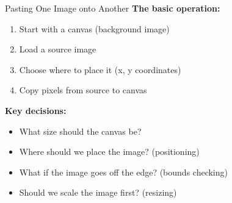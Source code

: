 \documentclass{csbeamer}
\begin{document}
\begin{frame}{Pasting One Image onto Another}
    \textbf{The basic operation:}

    \vspace{1em}

    \begin{enumerate}
        \item<1-> Start with a \textcolor{stfxblue}{canvas} (background image)
        \item<2-> Load a source image
        \item<3-> Choose where to place it (x, y coordinates)
        \item<4-> Copy pixels from source to canvas
    \end{enumerate}

    \vspace{1em}

    \pause

    \textbf{Key decisions:}
    \begin{itemize}
        \item<6-> What size should the canvas be?
        \item<7-> Where should we place the image? (positioning)
        \item<8-> What if the image goes off the edge? (bounds checking)
        \item<9-> Should we scale the image first? (resizing)
    \end{itemize}
\end{frame}
\end{document}
